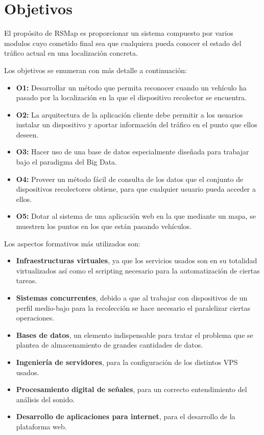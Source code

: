\chapter{Objetivos}

El propósito de RSMap es proporcionar un sistema compuesto por varios modulos cuyo cometido final sea que cualquiera pueda conocer el estado del tráfico actual en una localización concreta.

\bigskip
Los objetivos se enumeran con más detalle a continuación:

\begin{itemize}
  \item \textbf{O1:} Desarrollar un método que permita reconocer cuando un vehículo ha pasado por la localización en la que el dispositivo recolector se encuentra.
  \item \textbf{O2:} La arquitectura de la aplicación cliente debe permitir a los usuarios instalar un dispositivo y aportar información del tráfico en el punto que ellos deseen.
  \item \textbf{O3:} Hacer uso de una base de datos especialmente diseñada para trabajar bajo el paradigma del Big Data.
  \item \textbf{O4:} Proveer un método fácil de consulta de los datos que el conjunto de dispositivos recolectores obtiene, para que cualquier usuario pueda acceder a ellos.
  \item \textbf{O5:} Dotar al sistema de una aplicación web en la que mediante un mapa, se muestren los puntos en los que están pasando vehículos.
\end{itemize}

\newpage

Los aspectos formativos más utilizados son:
\begin{itemize}
  \item \textbf{Infraestructuras virtuales}, ya que los servicios usados son en su totalidad virtualizados así como el scripting necesario para la automatización de ciertas tareas.
  \item \textbf{Sistemas concurrentes}, debido a que al trabajar con dispositivos de un perfil medio-bajo para la recolección se hace necesario el paralelizar ciertas operaciones.
  \item \textbf{Bases de datos}, un elemento indispensable para tratar el problema que se plantea de almacenamiento de grandes cantidades de datos.
  \item \textbf{Ingeniería de servidores}, para la configuración de los distintos VPS usados.
  \item \textbf{Procesamiento digital de señales}, para un correcto entendimiento del análisis del sonido.
  \item \textbf{Desarrollo de aplicaciones para internet}, para el desarrollo de la plataforma web.
\end{itemize}

